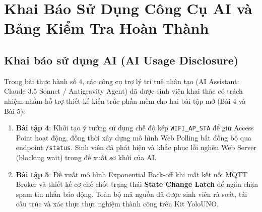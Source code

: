\vspace{0.5cm}
\section{Khai Báo Sử Dụng Công Cụ AI và Bảng Kiểm Tra Hoàn Thành}

\subsection{Khai báo sử dụng AI (AI Usage Disclosure)}
Trong bài thực hành số 4, các công cụ trợ lý trí tuệ nhân tạo (AI Assistant: Claude 3.5 Sonnet / Antigravity Agent) đã được sinh viên khai thác có trách nhiệm nhằm hỗ trợ thiết kế kiến trúc phần mềm cho hai bài tập mở (Bài 4 và Bài 5):
\begin{enumerate}
    \item \textbf{Bài tập 4}: Khởi tạo ý tưởng sử dụng chế độ kép \texttt{WIFI\_AP\_STA} để giữ Access Point hoạt động, đồng thời xây dựng mô hình Web Polling bất đồng bộ qua endpoint \texttt{/status}. Sinh viên đã phát hiện và khắc phục lỗi nghẽn Web Server (blocking wait) trong đề xuất sơ khởi của AI.
    \item \textbf{Bài tập 5}: Đề xuất mô hình Exponential Back-off khi mất kết nối MQTT Broker và thiết kế cơ chế chốt trạng thái \textbf{State Change Latch} để ngăn chặn spam tin nhắn báo động. Toàn bộ mã nguồn đã được sinh viên rà soát, tái cấu trúc và xác thực thực nghiệm thành công trên Kit YoloUNO.
\end{enumerate}

